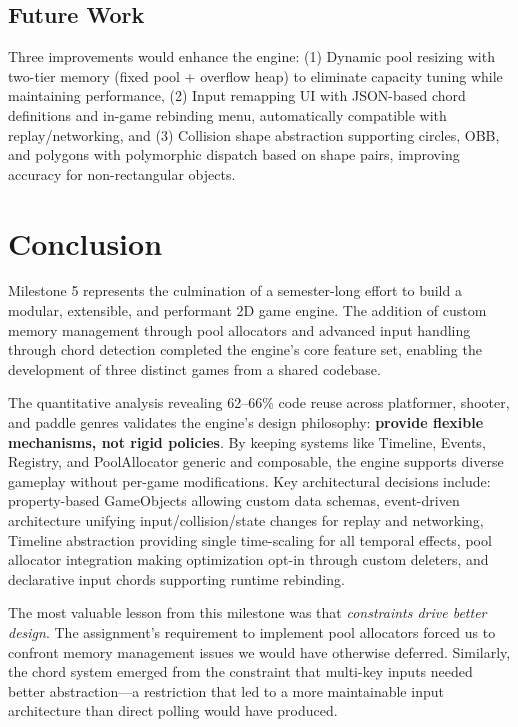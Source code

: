 \documentclass[12pt]{article}
\begin{document}
\subsection{Future Work}

Three improvements would enhance the engine: (1) Dynamic pool resizing with two-tier memory (fixed pool + overflow heap) to eliminate capacity tuning while maintaining performance, (2) Input remapping UI with JSON-based chord definitions and in-game rebinding menu, automatically compatible with replay/networking, and (3) Collision shape abstraction supporting circles, OBB, and polygons with polymorphic dispatch based on shape pairs, improving accuracy for non-rectangular objects.

\section*{Conclusion}

Milestone 5 represents the culmination of a semester-long effort to build a modular, extensible, and performant 2D game engine. The addition of custom memory management through pool allocators and advanced input handling through chord detection completed the engine's core feature set, enabling the development of three distinct games from a shared codebase.

The quantitative analysis revealing 62--66\% code reuse across platformer, shooter, and paddle genres validates the engine's design philosophy: \textbf{provide flexible mechanisms, not rigid policies}. By keeping systems like Timeline, Events, Registry, and PoolAllocator generic and composable, the engine supports diverse gameplay without per-game modifications. Key architectural decisions include: property-based GameObjects allowing custom data schemas, event-driven architecture unifying input/collision/state changes for replay and networking, Timeline abstraction providing single time-scaling for all temporal effects, pool allocator integration making optimization opt-in through custom deleters, and declarative input chords supporting runtime rebinding.

The most valuable lesson from this milestone was that \emph{constraints drive better design}. The assignment's requirement to implement pool allocators forced us to confront memory management issues we would have otherwise deferred. Similarly, the chord system emerged from the constraint that multi-key inputs needed better abstraction—a restriction that led to a more maintainable input architecture than direct polling would have produced.
\end{document}
